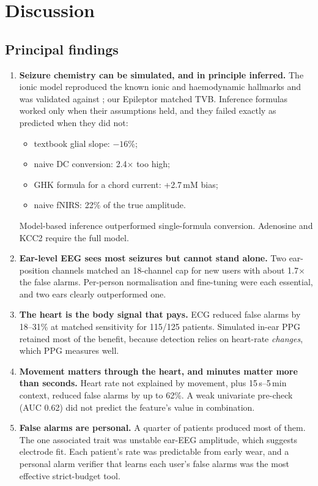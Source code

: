 \section{Discussion}
\label{sec:discussion}

\subsection{Principal findings}

\begin{enumerate}
\item \textbf{Seizure chemistry can be simulated, and in principle inferred.} The ionic model reproduced the known ionic and haemodynamic hallmarks and was validated against \cite{cressman2009}; our Epileptor matched TVB. Inference formulas worked only when their assumptions held, and they failed exactly as predicted when they did not:
\begin{itemize}
\item textbook glial slope: $-16$\%;
\item naive DC conversion: 2.4$\times$ too high;
\item GHK formula for a chord current: +2.7\,mM bias;
\item naive fNIRS: 22\% of the true amplitude.
\end{itemize}
Model-based inference outperformed single-formula conversion. Adenosine and KCC2 require the full model.
\item \textbf{Ear-level EEG sees most seizures but cannot stand alone.} Two ear-position channels matched an 18-channel cap for new users with about 1.7$\times$ the false alarms. Per-person normalisation and fine-tuning were each essential, and two ears clearly outperformed one.
\item \textbf{The heart is the body signal that pays.} ECG reduced false alarms by 18--31\% at matched sensitivity for 115/125 patients. Simulated in-ear PPG retained most of the benefit, because detection relies on heart-rate \emph{changes}, which PPG measures well.
\item \textbf{Movement matters through the heart, and minutes matter more than seconds.} Heart rate not explained by movement, plus 15\,s--5\,min context, reduced false alarms by up to 62\%. A weak univariate pre-check (AUC 0.62) did not predict the feature's value in combination.
\item \textbf{False alarms are personal.} A quarter of patients produced most of them. The one associated trait was unstable ear-EEG amplitude, which suggests electrode fit. Each patient's rate was predictable from early wear, and a personal alarm verifier that learns each user's false alarms was the most effective strict-budget tool.

\end{enumerate}
